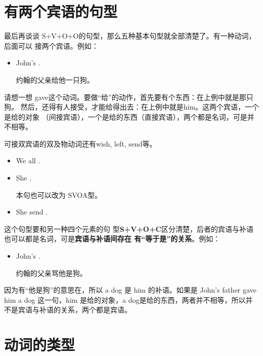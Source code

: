 \section{有两个宾语的句型}

最后再谈谈 S+V+O+O的句型，那么五种基本句型就全部清楚了。有一种动词，后面可以
接两个宾语。例如：
\begin{itemize}
\item John's    .

  约翰的父亲给他一只狗。
\end{itemize}

请想一想 gave这个动词。要做“给”的动作，首先要有个东西：在上例中就是那只狗。
然后，还得有人接受，才能给得出去：在上例中就是him。这两个宾语，一个是给的对象
（间接宾语），一个是给的东西（直接宾语），两个都是名词，可是并不相等。

可接双宾语的双及物动词还有wish, left, send等。
\begin{itemize}
\item We all   .

\item She   .

  本句也可以改为 SVOA型。

\item She send  .

\end{itemize}


这个句型要和另一种四个元素的句
型\textbf{S+V+O+C}区分清楚，后者的宾语与补语也可以都是名词，可是\textbf{宾语与补语间存在
  有“等于是”的关系}。例如：
\begin{itemize}
\item John's    .

  约翰的父亲骂他是狗。
\end{itemize}

因为有“他是狗”的意思在，所以 a dog 是 him 的补语。如果是 John's father
gave him a dog 这一句，him 是给的对象，a dog是给的东西，两者并不相等，所以并
不是宾语与补语的关系，两个都是宾语。

\section{动词的类型}

